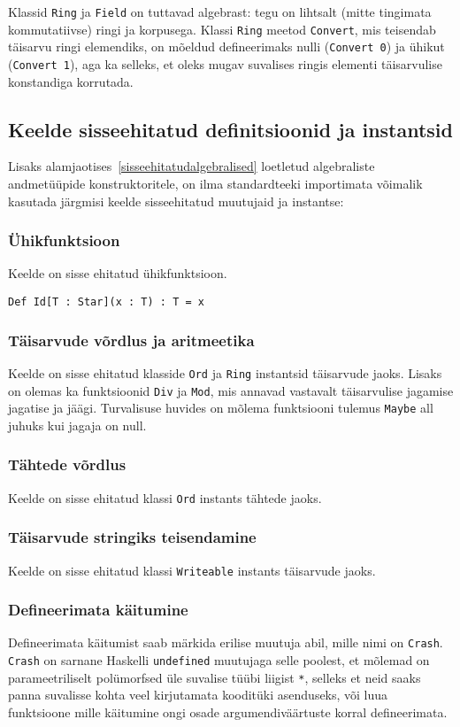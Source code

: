 \documentclass[12pt]{article}
\begin{document}
        Klassid \verb!Ring! ja \verb!Field! on tuttavad algebrast: tegu on lihtsalt (mitte tingimata kommutatiivse) ringi ja korpusega. Klassi \verb!Ring! meetod \verb!Convert!, mis teisendab täisarvu ringi elemendiks, on mõeldud defineerimaks nulli (\verb!Convert 0!) ja ühikut (\verb!Convert 1!), aga ka selleks, et oleks mugav suvalises ringis elementi täisarvulise konstandiga korrutada.
    \subsection{Keelde sisseehitatud definitsioonid ja instantsid}
      Lisaks alamjaotises~\ref{sisseehitatudalgebralised} loetletud algebraliste andmetüüpide konstruktoritele, on ilma standardteeki importimata võimalik kasutada järgmisi keelde sisseehitatud muutujaid ja instantse:
      \subsubsection{Ühikfunktsioon}
        Keelde on sisse ehitatud ühikfunktsioon.

        \begin{verbatim}Def Id[T : Star](x : T) : T = x\end{verbatim}
      \subsubsection{Täisarvude võrdlus ja aritmeetika}
        Keelde on sisse ehitatud klasside \verb!Ord! ja \verb!Ring! instantsid täisarvude jaoks. Lisaks on olemas ka funktsioonid \verb!Div! ja \verb!Mod!, mis annavad vastavalt täisarvulise jagamise jagatise ja jäägi. Turvalisuse huvides on mõlema funktsiooni tulemus \verb!Maybe! all juhuks kui jagaja on null.
      \subsubsection{Tähtede võrdlus}
        Keelde on sisse ehitatud klassi \verb!Ord! instants tähtede jaoks.
      \subsubsection{Täisarvude stringiks teisendamine}
        Keelde on sisse ehitatud klassi \verb!Writeable! instants täisarvude jaoks.
      \subsubsection{Defineerimata käitumine}
        Defineerimata käitumist saab märkida erilise muutuja abil, mille nimi on \verb!Crash!. \verb!Crash! on sarnane Haskelli \verb!undefined! muutujaga selle poolest, et mõlemad on parameetriliselt polümorfsed üle suvalise tüübi liigist \verb!*!, selleks et neid saaks panna suvalisse kohta veel kirjutamata kooditüki asenduseks, või luua funktsioone mille käitumine ongi osade argumendiväärtuste korral defineerimata.
\end{document}
